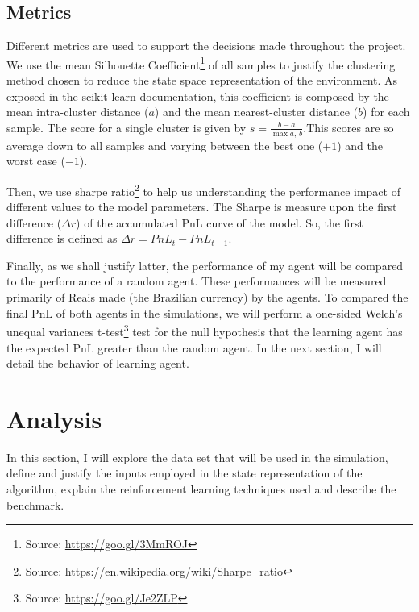 \documentclass[a4paper]{article}
\begin{document}
\subsection{Metrics}
Different metrics are used to support the decisions made throughout the project. We use the mean Silhouette Coefficient\footnote{Source: \url{https://goo.gl/3MmROJ}} of all samples to justify the clustering method chosen to reduce the state space representation of the environment. As exposed in the scikit-learn documentation, this coefficient is composed by the mean intra-cluster distance ($a$) and the mean nearest-cluster distance ($b$) for each sample. The score for a single cluster is given by $s = \frac{b-a}{\max{a, \, b}}$.This scores are so average down to all samples and varying between the best one ($+ 1$) and the worst case ($-1$).

Then, we use sharpe ratio\footnote{Source: \url{https://en.wikipedia.org/wiki/Sharpe_ratio}} to help us understanding the performance impact of different values to the model parameters. The Sharpe is measure upon the first difference ($\Delta r$) of the accumulated PnL curve of the model. So, the first difference is defined as $\Delta r = PnL_t - PnL_{t-1}$.

Finally, as we shall justify latter, the performance of my agent will be compared to the performance of a random agent. These performances will be measured primarily of Reais made (the Brazilian currency) by the agents. To compared the final PnL of both agents in the simulations, we will perform a one-sided Welch's unequal variances t-test\footnote{Source: \url{https://goo.gl/Je2ZLP}} test for the null hypothesis that the learning agent has the expected PnL greater than the random agent. In the next section, I will detail the behavior of learning agent.


\section{Analysis}
\label{sec:analysis}

In this section, I will explore the data set that will be used in the simulation, define and justify the inputs employed in the state representation of the algorithm, explain the reinforcement learning techniques used and describe the benchmark.
\end{document}
